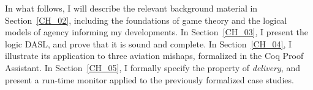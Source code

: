 
In what follows, I will describe the relevant background material in Section~\ref{CH_02}, including the foundations of game theory and the logical models of agency informing my developments. In Section~\ref{CH_03}, I present the logic DASL, and prove that it is sound and complete. In Section~\ref{CH_04}, I illustrate its application to three aviation mishaps, formalized in the Coq Proof Assistant. In Section~\ref{CH_05}, I formally specify the property of \emph{delivery}, and present a run-time monitor applied to the previously formalized case studies.